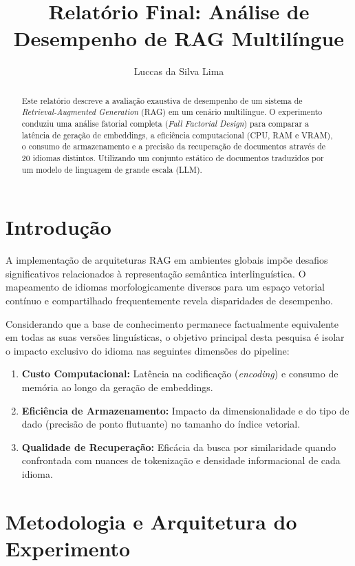\documentclass[manuscript,screen]{acmart}
\title{Relatório Final: Análise de Desempenho de RAG Multilíngue}
\author{Luccas da Silva Lima}
\affiliation{%
  \institution{Universidade Federal do Rio Grande do Sul}
  \country{Brasil}
}
\begin{document}
\begin{abstract}
Este relatório descreve a avaliação exaustiva de desempenho de um sistema de \textit{Retrieval-Augmented Generation} (RAG) em um cenário multilíngue. O experimento conduziu uma análise fatorial completa (\textit{Full Factorial Design}) para comparar a latência de geração de embeddings, a eficiência computacional (CPU, RAM e VRAM), o consumo de armazenamento e a precisão da recuperação de documentos através de 20 idiomas distintos. Utilizando um conjunto estático de documentos traduzidos por um modelo de linguagem de grande escala (LLM).
\end{abstract}

\maketitle

\section{Introdução}
A implementação de arquiteturas RAG em ambientes globais impõe desafios significativos relacionados à representação semântica interlinguística. O mapeamento de idiomas morfologicamente diversos para um espaço vetorial contínuo e compartilhado frequentemente revela disparidades de desempenho.

Considerando que a base de conhecimento permanece factualmente equivalente em todas as suas versões linguísticas, o objetivo principal desta pesquisa é isolar o impacto exclusivo do idioma nas seguintes dimensões do pipeline:
\begin{enumerate}
    \item \textbf{Custo Computacional:} Latência na codificação (\textit{encoding}) e consumo de memória ao longo da geração de embeddings.
    \item \textbf{Eficiência de Armazenamento:} Impacto da dimensionalidade e do tipo de dado (precisão de ponto flutuante) no tamanho do índice vetorial.
    \item \textbf{Qualidade de Recuperação:} Eficácia da busca por similaridade quando confrontada com nuances de tokenização e densidade informacional de cada idioma.
\end{enumerate}

\section{Metodologia e Arquitetura do Experimento}
\end{document}
